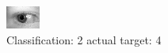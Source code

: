 \begin{figure}[h!]
\begin{center}
\includegraphics[width=0.60\columnwidth]{figures/ID721_class_2_target_4.png}
\end{center}
\caption{ Classification: 2 actual target: 4}
\label{fig:ID721_class_2_target_4}
\end{figure}
